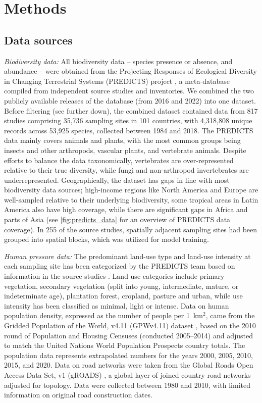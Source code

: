 
\section*{Methods}

\subsection*{Data sources}

\textit{Biodiversity data:} All biodiversity data -- species presence or absence, and abundance -- were obtained from the Projecting Responses of Ecological Diversity in Changing Terrestrial Systems (PREDICTS) project \cite{hudson2017}, a meta-database compiled from independent source studies and inventories. We combined the two publicly available releases of the database (from 2016 and 2022) \cite{hudson2023,contu2022} into one dataset. Before filtering (see further down), the combined dataset contained data from 817 studies comprising 35,736 sampling sites in 101 countries, with 4,318,808 unique records across 53,925 species, collected between 1984 and 2018. The PREDICTS data mainly covers animals and plants, with the most common groups being insects and other arthropods, vascular plants, and vertebrate animals. Despite efforts to balance the data taxonomically, vertebrates are over-represented relative to their true diversity, while fungi and non-arthropod invertebrates are underrepresented. Geographically, the dataset has gaps in line with most biodiversity data sources; high-income regions like North America and Europe are well-sampled relative to their underlying biodiversity, some tropical areas in Latin America also have high coverage, while there are significant gaps in Africa and parts of Asia (see \autoref{fig:predicts_data} for an overview of PREDICTS data coverage). In 255 of the source studies, spatially adjacent sampling sites had been grouped into spatial blocks, which was utilized for model training.

\textit{Human pressure data:} The predominant land-use type and land-use intensity at each sampling site has been categorized by the PREDICTS team based on information in the source studies \cite{hudson2017}. Land-use categories include primary vegetation, secondary vegetation (split into young, intermediate, mature, or indeterminate age), plantation forest, cropland, pasture and urban, while use intensity has been classified as minimal, light or intense. Data on human population density, expressed as the number of people per 1~km$^2$, came from the Gridded Population of the World, v4.11 (GPWv4.11) dataset \cite{gpw2017}, based on the 2010 round of Population and Housing Censuses (conducted 2005--2014) and adjusted to match the United Nations World Population Prospects country totals. The population data represents extrapolated numbers for the years 2000, 2005, 2010, 2015, and 2020.  Data on road networks were taken from the Global Roads Open Access Data Set, v1 (gROADS) \cite{groads2013}, a global layer of joined country road networks adjusted for topology. Data were collected between 1980 and 2010, with limited information on original road construction dates.

